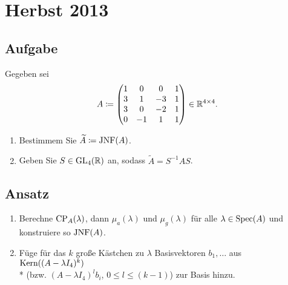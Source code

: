 \newpage

\section{Herbst 2013}

\subsection{Aufgabe}
Gegeben sei
\begin{equation*}
	A \coloneqq \begin{pmatrix}
		1 & 0 & 0 & 1 \\
		3 & 1 & -3 & 1 \\
		3 & 0 & -2 & 1 \\
		0 & -1 & 1 & 1 
	\end{pmatrix} \in \mathbb{R}^{4 \times 4}\text{.}
\end{equation*}
\begin{enumerate}
	\item Bestimmem Sie \( \widetilde{A} \coloneqq \text{JNF}(A) \).
	\item Geben Sie \( S \in \text{GL}_4(\mathbb{R}) \) an, sodass \( \widetilde{A} = S^{-1}AS \).
\end{enumerate}

\subsection{Ansatz}
\begin{enumerate}
	\item Berechne \( \text{CP}_A(\lambda) \), dann \( \mu_a(\lambda) \) und \( \mu_g(\lambda) \) für alle \( \lambda \in \text{Spec}(A) \) und konstruiere so \( \text{JNF}(A) \).
	\item Füge für das \( k \) große Kästchen zu \( \lambda \) Basisvektoren \( b_1,\dots \) aus \( \text{Kern}((A-\lambda I_4)^k) \) \\* (bzw. \( (A-\lambda I_4)^lb_i \), \( 0 \leq l \leq (k-1) \)) zur Basis hinzu.
\end{enumerate}

